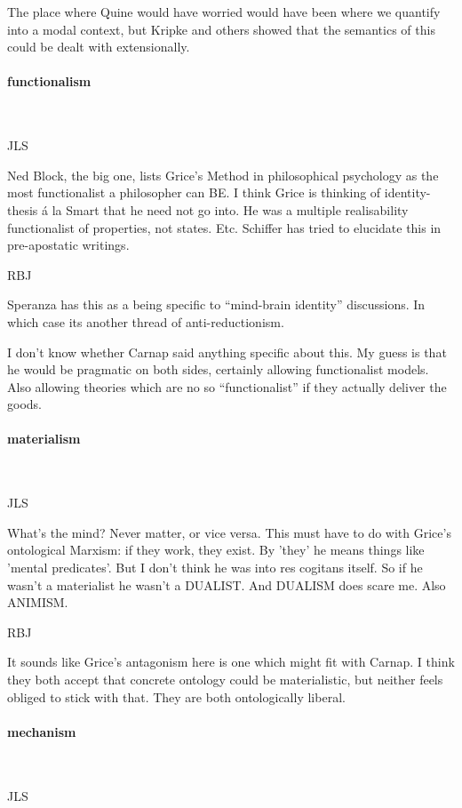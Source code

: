 \documentclass[10pt,titlepage]{book}
\begin{document}
The place where Quine would have worried would have been where we quantify into a modal context, but Kripke and others showed that the semantics of this could be dealt with extensionally.

\paragraph{functionalism}\ 

JLS

Ned Block, the big one, lists Grice's Method in  
philosophical psychology as the most functionalist a philosopher can BE.
I think  Grice is thinking of identity-thesis \'a la Smart that he need not go into.
He was a multiple realisability functionalist of properties, not states. Etc. 
Schiffer has tried to elucidate this in pre-apostatic writings.

RBJ

Speranza has this as a being specific to ``mind-brain identity'' discussions.
In which case its another thread of anti-reductionism.

I don't know whether Carnap said anything specific about this.
My guess is that he would be pragmatic on both sides, certainly allowing functionalist models.
Also allowing theories which are no so ``functionalist'' if they actually deliver the goods.

\paragraph{materialism}\ 

JLS

What's the mind? Never matter, or vice versa. This must have  
to do with Grice's ontological Marxism: if they work, they exist. By 'they' 
he  means things like 'mental predicates'. But I don't think he was into res 
 cogitans itself. So if he wasn't a materialist he wasn't a DUALIST. And 
DUALISM  does scare me. Also ANIMISM.

RBJ

It sounds like Grice's antagonism here is one which might fit with Carnap.
I think they both accept that concrete ontology could be materialistic, but neither feels obliged to stick with that.
They are both ontologically liberal.
 
\paragraph{mechanism}\ 

JLS
\end{document}
